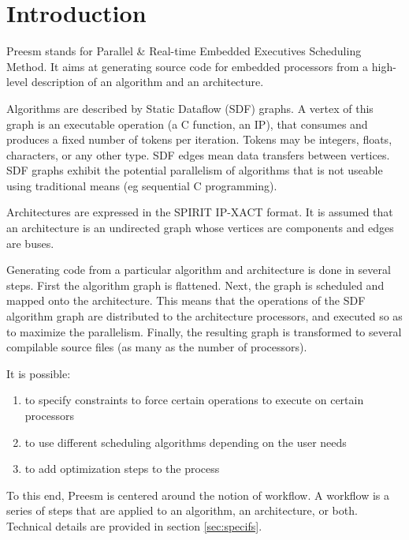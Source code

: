 \chapter{Introduction}

Preesm stands for Parallel \& Real-time Embedded Executives Scheduling Method. It aims at generating source code for embedded processors from a high-level description of an algorithm and an architecture.

Algorithms are described by Static Dataflow (SDF) graphs. A vertex of this graph is an executable operation (a C function, an IP), that consumes and produces a fixed number of tokens per iteration. Tokens may be integers, floats, characters, or any other type. SDF edges mean data transfers between vertices. SDF graphs exhibit the potential parallelism of algorithms that is not useable using traditional means (eg sequential C programming).

Architectures are expressed in the SPIRIT IP-XACT format. It is assumed that an architecture is an undirected graph whose vertices are components and edges are buses.

Generating code from a particular algorithm and architecture is done in several steps. First the algorithm graph is flattened. Next, the graph is scheduled and mapped onto the architecture. This means that the operations of the SDF algorithm graph are distributed to the architecture processors, and executed so as to maximize the parallelism. Finally, the resulting graph is transformed to several compilable source files (as many as the number of processors).

It is possible:
\begin{enumerate}
	\item to specify constraints to force certain operations to execute on certain processors
	\item to use different scheduling algorithms depending on the user needs
	\item to add optimization steps to the process
\end{enumerate}

To this end, Preesm is centered around the notion of workflow. A workflow is a series of steps that are applied to an algorithm, an architecture, or both. Technical details are provided in section \ref{sec:specifs}.
